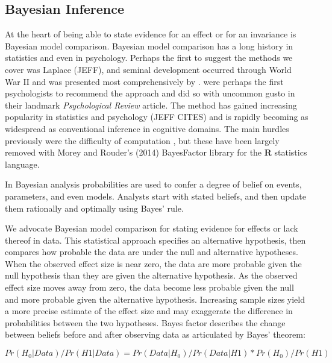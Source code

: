 \documentclass[fignum,nobf,man]{apa}
\begin{document}
\subsection{Bayesian Inference}
At the heart of being able to state evidence for an effect or for an invariance is Bayesian model comparison.  Bayesian model comparison has a long history in statistics and even in psychology.  Perhaps the first to suggest the methods we cover was Laplace (JEFF), and seminal development occurred through World War II and was presented most comprehensively by \citet{Jeffreys:1961}.  \citet{Edwards:etal:1963} were perhaps the first psychologists to recommend the approach and did so with uncommon gusto in their landmark {\em Psychological Review} article.  The method has gained increasing popularity in statistics and psychology (JEFF CITES) and is rapidly becoming as widespread as conventional inference in cognitive domains.  
The main hurdles previously were the difficulty of computation \citep{Gallistel:2009}, but these have been largely removed with Morey and Rouder's (2014) BayesFactor library for the {\bf R} statistics language.

In Bayesian analysis probabilities are used to confer a degree of belief on events, parameters, and even models.  Analysts start with stated beliefs, and then update them rationally and optimally using Bayes' rule.  
 
 
We advocate Bayesian model comparison for stating evidence for effects or lack thereof in data. %
This statistical approach specifies an alternative hypothesis, then compares how probable the data are under the null and alternative hypotheses. When the observed effect size is near zero, the data are more probable given the null hypothesis than they are given the alternative hypothesis. As the observed effect size moves away from zero, the data become less probable given the null and more probable given the alternative hypothesis.  Increasing sample sizes yield a more precise estimate of the effect size and may exaggerate the difference in probabilities between the two hypotheses. Bayes factor describes the change between beliefs before and after observing data as articulated by Bayes’ theorem:

\begin{equation}
Pr(H_0 | Data) / Pr(H1 | Data) = Pr(Data | H_0) / Pr(Data | H1) * Pr(H_0) / Pr (H1) 
\end{equation}
\end{document}
